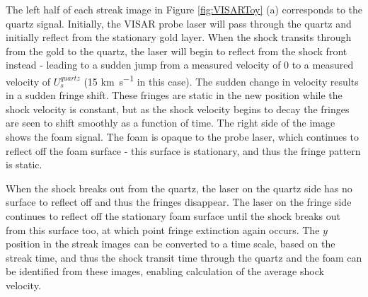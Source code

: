 The left half of each streak image in Figure \ref{fig:VISARToy} (a) corresponds to the quartz signal. Initially, the VISAR probe laser will pass through the quartz and initially reflect from the stationary gold layer. When the shock transits through from the gold to the quartz, the laser will begin to reflect from the shock front instead - leading to a sudden jump from a measured velocity of 0 to a measured velocity of $U_{s}^{quartz}$ (15 \unit{\kilo\meter\per\second} in this case). The sudden change in velocity results in a sudden fringe shift. These fringes are static in the new position while the shock velocity is constant, but as the shock velocity begins to decay the fringes are seen to shift smoothly as a function of time. The right side of the image shows the foam signal. The foam is opaque to the probe laser, which continues to reflect off the foam surface - this surface is stationary, and thus the fringe pattern is static.

When the shock breaks out from the quartz, the laser on the quartz side has no surface to reflect off and thus the fringes disappear. The laser on the fringe side continues to reflect off the stationary foam surface until the shock breaks out from this surface too, at which point fringe extinction again occurs. The $y$ position in the streak images can be converted to a time scale, based on the streak time, and thus the shock transit time through the quartz and the foam can be identified from these images, enabling calculation of the average shock velocity.

